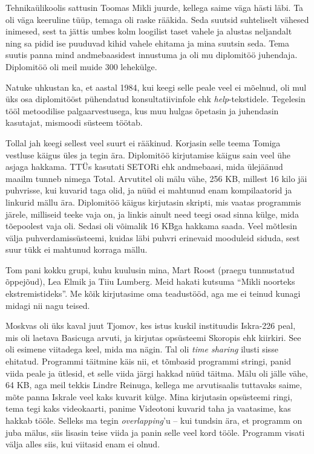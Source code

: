  
Tehnikaülikoolis sattusin 
Toomas Mikli juurde, kellega saime väga hästi 
läbi. Ta oli väga keeruline tüüp, temaga oli raske rääkida. 
Seda suutsid suhteliselt vähesed inimesed, sest ta jättis umbes kolm loogilist 
taset vahele ja alustas neljandalt ning sa pidid ise puuduvad kihid vahele 
ehitama ja mina suutsin seda. 
Tema suutis panna mind andmebaasidest innustuma ja oli 
mu diplomitöö juhendaja. Diplomitöö oli meil muide 300 lehekülge. 

Natuke uhkustan ka, et aastal 1984, kui keegi selle peale veel ei mõelnud, oli mul üks osa
diplomitööst pühendatud konsultatiivinfole ehk \emph{help}-tekstidele. 
Tegelesin tööl metoodilise palgaarvestusega, kus muu 
hulgas õpetasin ja juhendasin kasutajat, mismoodi süsteem töötab. 


Tollal jah keegi sellest veel suurt ei rääkinud. Korjasin selle teema
Tomiga vestluse käigus üles ja tegin ära. 
Diplomitöö kirjutamise käigus sain veel ühe asjaga hakkama. TTÜs kasutati 
SETORi ehk andmebaasi, mida ülejäänud 
maailm tunneb nimega Total. Arvutitel 
oli mälu vähe, 256 KB, millest 16 kilo jäi puhvrisse, kui kuvarid taga 
olid, ja nüüd ei mahtunud enam kompilaatorid ja linkurid mällu ära. Diplomitöö 
käigus kirjutasin skripti, mis vaatas programmis järele, milliseid teeke 
vaja on, ja linkis ainult need teegi osad sinna külge, mida tõepoolest vaja 
oli. Sedasi oli võimalik 16 KBga hakkama saada. Veel mõtlesin välja puhverdamissüsteemi, kuidas läbi puhvri erinevaid mooduleid siduda, sest 
suur tükk ei mahtunud korraga mällu. 

Tom pani kokku grupi, kuhu kuulusin mina, Mart Roost 
(praegu tunnustatud õppejõud), Lea 
Elmik ja Tiiu Lumberg. Meid hakati kutsuma \enquote{Mikli noorteks 
ekstremistideks}. Me kõik kirjutasime oma teadustööd, aga me ei teinud 
kunagi midagi nii nagu teised. 

Moskvas oli üks kaval juut Tjomov, kes istus kuskil instituudis 
Iskra-226 peal, mis oli laetava Basicuga arvuti, ja
kirjutas opsüsteemi Skoropis ehk kiirkiri. See oli esimene viitadega keel, 
mida ma nägin. Tal oli \emph{time sharing} ilusti sisse ehitatud. Programmi täitmine 
käis nii, et tõmbasid programmi stringi, panid viida peale ja ütlesid, et 
selle viida järgi hakkad nüüd täitma. Mälu oli jälle vähe, 64 KB, aga meil 
tekkis Lindre Reinuga, kellega me 
arvutisaalis tuttavaks saime, mõte panna Iskrale veel kaks kuvarit külge. Mina 
kirjutasin opsüsteemi ringi, tema tegi kaks videokaarti, panime Videotoni kuvarid 
taha ja vaatasime, kas hakkab tööle. Selleks ma tegin 
\emph{overlapping}'u -- kui tundsin ära, et programm on 
juba mälus, siis lisasin teise viida ja panin selle veel kord tööle. Programm visati 
välja alles siis, kui viitasid enam ei olnud. 

